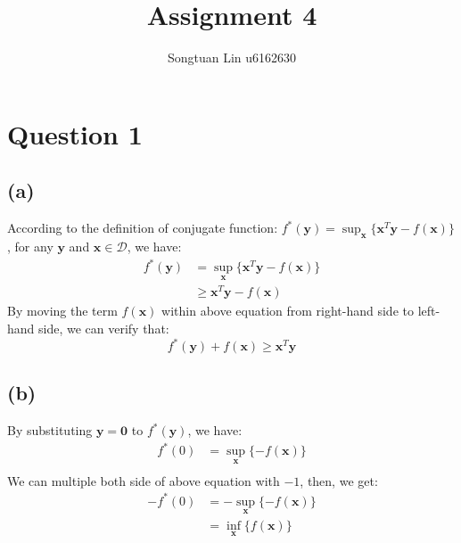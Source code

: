\documentclass[10pt,a4paper]{article}
\author{Songtuan Lin u6162630}
\title{Assignment 4}
\begin{document}
\maketitle

\section*{Question 1}
\subsection*{(a)}
According to the definition of conjugate function: $f^{*}(\mathbf{y}) = \displaystyle\sup_{\mathbf{x}}\{ \mathbf{x}^{T} \mathbf{y} - f(\mathbf{x}) \}$, for any $\mathbf{y}$ and $\mathbf{x} \in \mathcal{D}$, we have:
\begin{equation*}
	\begin{aligned}
		f^{*}(\mathbf{y}) &= \displaystyle\sup_{\mathbf{x}}\{ \mathbf{x}^{T} \mathbf{y} - f(\mathbf{x}) \} \\
		&\geq \mathbf{x}^{T} \mathbf{y} - f(\mathbf{x})
	\end{aligned} 
\end{equation*}
By moving the term $f(\mathbf{x})$ within above equation from right-hand side to left-hand side, we can verify that:
\begin{equation*}
	f^{*}(\mathbf{y}) + f(\mathbf{x}) \geq \mathbf{x}^{T} \mathbf{y}
\end{equation*}

\subsection*{(b)}
By substituting $\mathbf{y} = \mathbf{0}$ to $f^{*}(\mathbf{y})$, we have:
\begin{equation*}
	\begin{aligned}
		f^{*}(0) &= \displaystyle\sup_{\mathbf{x}} \{ -f(\mathbf{x}) \} \\
	\end{aligned}
\end{equation*}
We can multiple both side of above equation with $-1$, then, we get:
\begin{equation*}
	\begin{aligned}
		-f^{*}(0) &= - \displaystyle\sup_{\mathbf{x}} \{ -f(\mathbf{x}) \} \\
		&= \displaystyle\inf_{\mathbf{x}} \{ f(\mathbf{x}) \}
	\end{aligned}
\end{equation*}
\end{document}
